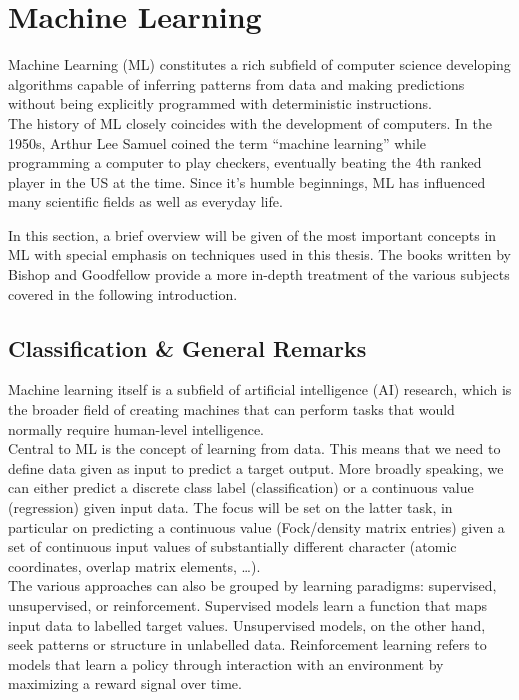 \section{Machine Learning}
\label{sec:background_ml}
Machine Learning (ML) constitutes a rich subfield of computer science developing algorithms capable of inferring patterns from data and making predictions without being explicitly programmed with deterministic instructions. \\
The history of ML closely coincides with the development of computers. In the 1950s, Arthur Lee Samuel coined the term ``machine learning'' while programming a computer to play checkers, eventually beating the 4th ranked player in the US at the time. \parencite{ref:knuth1989comments} Since it's humble beginnings, ML has influenced many scientific fields as well as everyday life.

In this section, a brief overview will be given of the most important concepts in ML with special emphasis on techniques used in this thesis. The books written by Bishop \parencite{ref:bishop2006pattern} and Goodfellow \parencite{ref:goodfellow2016deep} provide a more in-depth treatment of the various subjects covered in the following introduction.
\subsection{Classification \& General Remarks}
\label{subsec:background_ml_general_concepts}
Machine learning itself is a subfield of artificial intelligence (AI) research, which is the broader field of creating machines that can perform tasks that would normally require human-level intelligence. \\
Central to ML is the concept of learning from data. This means that we need to define data given as input to predict a target output. More broadly speaking, we can either predict a discrete class label (classification) or a continuous value (regression) given input data. The focus will be set on the latter task, in particular on predicting a continuous value (Fock/density matrix entries) given a set of continuous input values of substantially different character (atomic coordinates, overlap matrix elements, \dots). \\
The various approaches can also be grouped by learning paradigms: supervised, unsupervised, or reinforcement. Supervised models learn a function that maps input data to labelled target values. Unsupervised models, on the other hand, seek patterns or structure in unlabelled data. Reinforcement learning refers to models that learn a policy through interaction with an environment by maximizing a reward signal over time.


